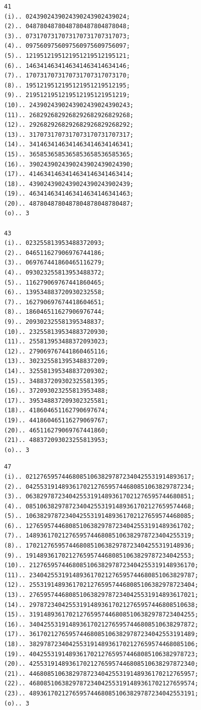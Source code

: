 \documentclass[10pt,a4paper]{article}
\begin{document}
\newpage
\setcounter{page}{415}

\begin{verbatim}
41
(i).. 0243902439024390243902439024;
(2).. 0487804878048780487804878048;
(3).. 0731707317073170731707317073;
(4).. 0975609756097560975609756097;
(5).. 1219512195121951219512195121;
(6).. 1463414634146341463414634146;
(7).. 1707317073170731707317073170;
(8).. 1951219512195121951219512195;
(9).. 2195121951219512195121951219;
(10).. 2439024390243902439024390243;
(11).. 2682926829268292682926829268;
(12).. 2926829268292682926829268292;
(13).. 3170731707317073170731707317;
(14).. 3414634146341463414634146341;
(15).. 3658536585365853658536585365;
(16).. 3902439024390243902439024390;
(17).. 4146341463414634146341463414;
(18).. 4390243902439024390243902439;
(19).. 4634146341463414634146341463;
(20).. 4878048780487804878048780487;
(o).. 3

43
(i).. 023255813953488372093;
(2).. 046511627906976744186;
(3).. 069767441860465116279;
(4).. 093023255813953488372;
(5).. 116279069767441860465;
(6).. 139534883720930232558;
(7).. 162790697674418604651;
(8).. 186046511627906976744;
(9).. 209302325581395348837;
(10).. 232558139534883720930;
(11).. 255813953488372093023;
(12).. 279069767441860465116;
(13).. 302325581395348837209;
(14).. 325581395348837209302;
(15).. 348837209302325581395;
(16).. 372093023255813953488;
(17).. 395348837209302325581;
(18).. 418604651162790697674;
(19).. 441860465116279069767;
(20).. 465116279069767441860;
(21).. 488372093023255813953;
(o).. 3
\end{verbatim}

\newpage
\setcounter{page}{416}

\begin{verbatim}
47
(i).. 0212765957446808510638297872340425531914893617;
(2).. 0425531914893617021276595744680851063829787234;
(3).. 0638297872340425531914893617021276595744680851;
(4).. 0851063829787234042553191489361702127659574468;
(5).. 1063829787234042553191489361702127659574468085;
(6).. 1276595744680851063829787234042553191489361702;
(7).. 1489361702127659574468085106382978723404255319;
(8).. 1702127659574468085106382978723404255319148936;
(9).. 1914893617021276595744680851063829787234042553;
(10).. 2127659574468085106382978723404255319148936170;
(11).. 2340425531914893617021276595744680851063829787;
(12).. 2553191489361702127659574468085106382978723404;
(13).. 2765957446808510638297872340425531914893617021;
(14).. 2978723404255319148936170212765957446808510638;
(15).. 3191489361702127659574468085106382978723404255;
(16).. 3404255319148936170212765957446808510638297872;
(17).. 3617021276595744680851063829787234042553191489;
(18).. 3829787234042553191489361702127659574468085106;
(19).. 4042553191489361702127659574468085106382978723;
(20).. 4255319148936170212765957446808510638297872340;
(21).. 4468085106382978723404255319148936170212765957;
(22).. 4680851063829787234042553191489361702127659574;
(23).. 4893617021276595744680851063829787234042553191;
(o).. 3
\end{verbatim}
\end{document}
